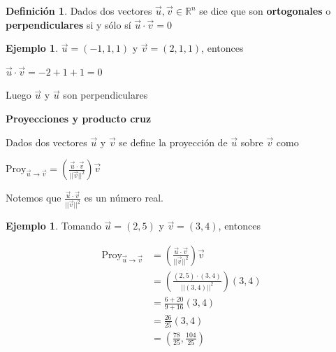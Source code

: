 \documentclass{article}
\theoremstyle{plain}
\theoremstyle{definition}
\newtheorem{defin}[thm]{Definición}
\newtheorem{ejem}[thm]{Ejemplo}
\begin{document}
\begin{defin}Dados dos vectores $\overrightarrow{u}, \overrightarrow{v} \in \mathbb{R}^n$ se dice que son \textbf{ortogonales } o \textbf{perpendiculares} si y sólo sí $\overrightarrow{u} \cdot \overrightarrow{v} = 0$ \\
\end{defin}

\begin{ejem}$\overrightarrow{u}= (-1,1,1)$ y $\overrightarrow{v} = (2,1,1)$, entonces
\end{ejem}

\begin{center}
$\overrightarrow{u} \cdot \overrightarrow{v} = -2+1+1=0 $
\end{center}


Luego $\overrightarrow{u}$ y $\overrightarrow{u}$ son perpendiculares




\newpage


\begin{center}
\textbf{\large{Proyecciones y producto cruz}} \\
\end{center}


Dados dos vectores $\overrightarrow{u}$ y $\overrightarrow{v}$ se define la proyección de $\overrightarrow{u}$ sobre $\overrightarrow{v}$ como

\begin{center}
$\displaystyle \text{Proy}_{\overrightarrow{u} \to \overrightarrow{v}} = \left( \frac{\overrightarrow{u} \cdot \overrightarrow{v}}{|| \overrightarrow{v}||^2} \right)  \overrightarrow{v}$
\end{center}

Notemos que $\displaystyle \frac{\overrightarrow{u} \cdot \overrightarrow{v}}{|| \overrightarrow{v}||^2}$ es un número real. \\


\begin{ejem}Tomando $\overrightarrow{u} =(2,5)$ y $\overrightarrow{v} =(3,4) $, entonces
\end{ejem}

\begin{align*}
\displaystyle \text{Proy}_{\overrightarrow{u} \to \overrightarrow{v}} &= \left( \frac{\overrightarrow{u} \cdot \overrightarrow{v}}{|| \overrightarrow{v}||^2} \right)  \overrightarrow{v} \\
&= \left( \frac{(2,5) \cdot (3,4)}{||(3,4)||^2} \right)  (3,4) \\
&= \frac{6+20}{9+16}   (3,4) \\
&= \frac{26}{25}   (3,4) \\
&= \left( \frac{78}{25},\frac{104}{25} \right)
\end{align*}
\end{document}
